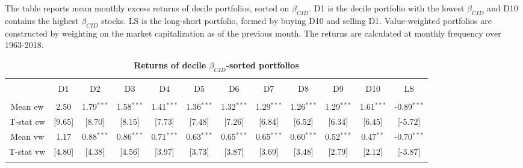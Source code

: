 \documentclass[12pt]{article}
\begin{document}
\begin{table}[!htbp] \centering 
  \caption{\textbf{Returns of decile $\beta_{CID}$-sorted portfolios}} 
  \label{} 
  \begin{flushleft}
    {\medskip\small
 The table reports mean monthly excess returns of decile portfolios, sorted on $\beta_{CID}$. D1 is the decile portfolio with the lowest $\beta_{CID}$ and D10 contains the highest $\beta_{CID}$ stocks. LS is the long-short portfolio, formed by buying D10 and selling D1. Value-weighted portfolios are constructed by weighting on the market capitalization as of the previous month. The returns are calculated at monthly frequency over 1963-2018.}
    \medskip
    \end{flushleft}
\begin{tabular}{@{\extracolsep{-5pt}} cccccccccccc} 
\\[-1.8ex]\hline 
\hline \\[-1.8ex] 
 & D1 & D2 & D3 & D4 & D5 & D6 & D7 & D8 & D9 & D10 & LS \\ 
\hline \\[-1.8ex] 
Mean ew & 2.50 & 1.79$^{***}$ & 1.58$^{***}$ & 1.41$^{***}$ & 1.36$^{***}$ & 1.32$^{***}$ & 1.29$^{***}$ & 1.26$^{***}$ & 1.29$^{***}$ & 1.61$^{***}$ & -0.89$^{***}$ \\ 
T-stat ew & [9.65] & [8.70] & [8.15] & [7.73] & [7.48] & [7.26] & [6.84] & [6.52] & [6.34] & [6.45] & [-5.72] \\ 
Mean vw & 1.17 & 0.88$^{***}$ & 0.86$^{***}$ & 0.71$^{***}$ & 0.63$^{***}$ & 0.65$^{***}$ & 0.65$^{***}$ & 0.60$^{***}$ & 0.52$^{***}$ & 0.47$^{**}$ & -0.70$^{***}$ \\ 
T-stat vw & [4.80] & [4.38] & [4.56] & [3.97] & [3.73] & [3.87] & [3.69] & [3.48] & [2.79] & [2.12] & [-3.87] \\ 
\hline \\[-1.8ex] 
\end{tabular} 
\end{table}
\end{document}
